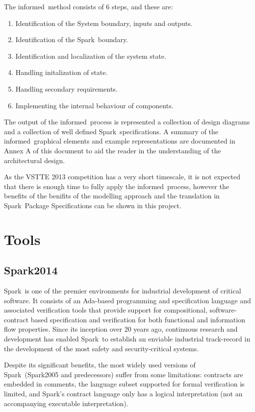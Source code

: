 \documentclass{report}
\newcommand{\spark}[0]{{\sc Spark}}
\newcommand{\informed}[0]{{\sc informed}}
\begin{document}
\noindent
The \informed\ method consists of 6 steps, and these are:

\begin{enumerate}
\item Identification of the System boundary, inputs and outputs.
\item Identification of the \spark\ boundary.
\item Identification and localization of the system state.
\item Handling initalization of state.
\item Handling secondary requirements.
\item Implementing the internal behaviour of components.
\end{enumerate}

\noindent
The output of the \informed\ process is represented a collection of
design diagrams and a collection of well defined \spark\
specifications. A summary of the \informed\ graphical elements and
example representations are documented in Annex A of this document to
aid the reader in the understanding of the architectural design.

As the VSTTE 2013 competition has a very short timescale, it is not
expected that there is enough time to fully apply the \informed\
process, however the benefits of the benifits of the modelling
approach and the translation in \spark\ Package Specifications can be
shown in this project.

\section{Tools}

\subsection{\spark 2014}
\spark\ is one of the premier environments for industrial development
of critical software. It consists of an Ada-based programming and
specification language and associated verification tools that provide
support for compositional, software-contract based specification and
verification for both functional and information flow
properties. Since its inception over 20 years ago, continuous research
and development has enabled \spark\ to establish an enviable
industrial track-record in the development of the most safety and
security-critical systems.

Despite its significant benefits, the most widely used versions of
\spark\ (\spark 2005 and predecessors) suffer from some limitations:
contracts are embedded in comments, the language subset supported for
formal verification is limited, and \spark's contract language only has
a logical interpretation (not an accompanying executable
interpretation).
\end{document}
